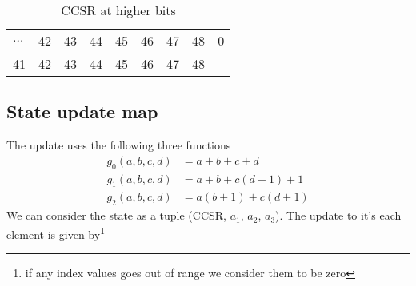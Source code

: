 \documentclass[a4paper,10pt]{article}
\begin{document}
\begin{itemize}
\begin{table}[h!]
\begin{tabular}{lllllllll}
\multicolumn{1}{|l|}{$\ldots$} & \multicolumn{1}{l|}{42} & \multicolumn{1}{l|}{43} & \multicolumn{1}{l|}{44} & \multicolumn{1}{l|}{45} & \multicolumn{1}{l|}{46} & \multicolumn{1}{l|}{47} & \multicolumn{1}{l|}{48} & 0 \\ \cline{1-8}
41                             & 42                      & 43                      & 44                      & 45                      & 46                      & 47                      & 48                      &  
\end{tabular}
\caption{CCSR at higher bits}
\label{tab:ccsr}
\end{table}
\end{itemize}
\subsection{State update map}
The update uses the following three functions
\begin{equation}
    \begin{aligned}
    g_0(a,b,c,d) &= a+b+c+d\\
    g_1(a,b,c,d) &= a+b+c(d+1)+1\\
    g_2(a,b,c,d) &= a(b+1)+c(d+1)
    \end{aligned}
\end{equation}
We can consider the state as a tuple (CCSR, $a_{1}$, $a_{2}$, $a_{3}$). The update to it's each element is given by\footnote{if any index values goes out of range we consider them to be zero}
\end{document}
